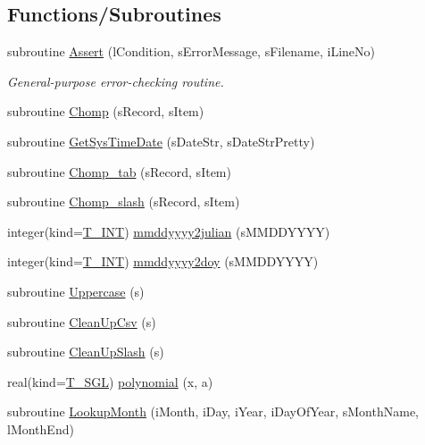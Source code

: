 \subsection*{Functions/Subroutines}
\begin{DoxyCompactItemize}
\item 
subroutine \hyperlink{namespacetypes_a3fffb62907acf0b6fb805c1e93ed18d9}{Assert} (lCondition, sErrorMessage, sFilename, iLineNo)
\begin{DoxyCompactList}\small\item\em General-\/purpose error-\/checking routine. \item\end{DoxyCompactList}\item 
subroutine \hyperlink{namespacetypes_af6e75e8cc451db57eac17135489f6112}{Chomp} (sRecord, sItem)
\item 
subroutine \hyperlink{namespacetypes_a69b9c0fe76bf005ec3d97b9fd7eb9f41}{GetSysTimeDate} (sDateStr, sDateStrPretty)
\item 
subroutine \hyperlink{namespacetypes_a32b4376099e979b8ed2e52d2b7cbd1f2}{Chomp\_\-tab} (sRecord, sItem)
\item 
subroutine \hyperlink{namespacetypes_a04f9fe9c15a8f96624fb026b510f6a80}{Chomp\_\-slash} (sRecord, sItem)
\item 
integer(kind=\hyperlink{namespacetypes_a4e4d040a4425196c4d43be63e7e6103a}{T\_\-INT}) \hyperlink{namespacetypes_a43ae0de695c72e499737820794f9629e}{mmddyyyy2julian} (sMMDDYYYY)
\item 
integer(kind=\hyperlink{namespacetypes_a4e4d040a4425196c4d43be63e7e6103a}{T\_\-INT}) \hyperlink{namespacetypes_a5556730044ced12a261f38a13fe05eb8}{mmddyyyy2doy} (sMMDDYYYY)
\item 
subroutine \hyperlink{namespacetypes_a0bebcf106096e896fc12abc9b21825af}{Uppercase} (s)
\item 
subroutine \hyperlink{namespacetypes_a7fdd7b312cad86dbca730b5fc1fb205a}{CleanUpCsv} (s)
\item 
subroutine \hyperlink{namespacetypes_a52444756471a187f395929b01ec6175c}{CleanUpSlash} (s)
\item 
real(kind=\hyperlink{namespacetypes_af3012489af4c138f271f1bce244b7e51}{T\_\-SGL}) \hyperlink{namespacetypes_ad041e93921c33efc5f7b8cb099c9f3df}{polynomial} (x, a)
\item 
subroutine \hyperlink{namespacetypes_a7f346956c828d5fab15a3d5d087a10a8}{LookupMonth} (iMonth, iDay, iYear, iDayOfYear, sMonthName, lMonthEnd)
\item 

\end{DoxyCompactItemize}
